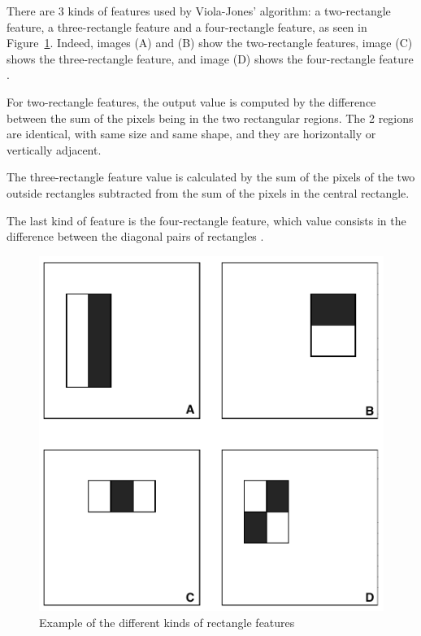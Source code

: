\noindent There are 3 kinds of features used by Viola-Jones' algorithm: a two-rectangle feature, a three-rectangle feature and a four-rectangle feature, as seen in Figure~\ref{haar_feature_description}. Indeed, images (A) and (B) show the two-rectangle features, image (C) shows the three-rectangle feature, and image (D) shows the four-rectangle feature \cite{VIO01}.
\newline

\noindent For two-rectangle features, the output value is computed by the difference between the sum of the pixels being in the two rectangular regions. The 2 regions are identical, with same size and same shape, and they are horizontally or vertically adjacent. 
\newline

\noindent The three-rectangle feature value is calculated by the sum of the pixels of the two outside rectangles subtracted from the sum of the pixels in the central rectangle. 
\newline

\noindent The last kind of feature is the four-rectangle feature, which value consists in the difference between the diagonal pairs of rectangles \cite{VIO01}.
\newline

\begin{figure}[!h]
\begin{center}
\noindent \includegraphics[scale=0.6]{figures/haar_feature_description} 
\newline
\caption{Example of the different kinds of rectangle features}
\label{haar_feature_description}
\end{center} 
\end{figure}


